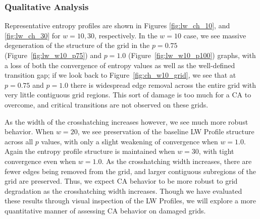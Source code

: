 \documentclass[a4paper,11pt]{article}
\begin{document}
\subsubsection*{Qualitative Analysis}

Representative entropy profiles are shown in Figures \ref{fig:lw_ch_10}, and \ref{fig:lw_ch_30} for \linebreak $w=10,30$, respectively. In the $w=10$ case, we see massive degeneration of the structure of the grid in the $p=0.75$ (Figure~\ref{fig:lw_w10_p75}) and $p=1.0$ (Figure~\ref{fig:lw_w10_p100}) graphs, with a loss of both the convergence of entropy values as well as the well-defined transition gap; if we look back to Figure~\ref{fig:ch_w10_grid}, we see that at $p=0.75$ and $p=1.0$ there is widespread edge removal across the entire grid with very little contiguous grid regions. This sort of damage is too much for a CA to overcome, and critical transitions are not observed on these grids.

As the width of the crosshatching increases however, we see much more robust behavior. When $w=20$, we see preservation of the baseline LW Profile structure across all $p$ values, with only a slight weakening of convergence when $w=1.0$. Again the entropy profile structure is maintained when $w=30$, with tight convergence even when $w=1.0$. As the crosshatching width increases, there are fewer edges being removed from the grid, and larger contiguous subregions of the grid are preserved. Thus, we expect CA behavior to be more robust to grid degradation as the crosshatching width increases. Though we have evaluated these results through visual inspection of the LW Profiles, we will explore a more quantitative manner of assessing CA behavior on damaged grids.
\end{document}

